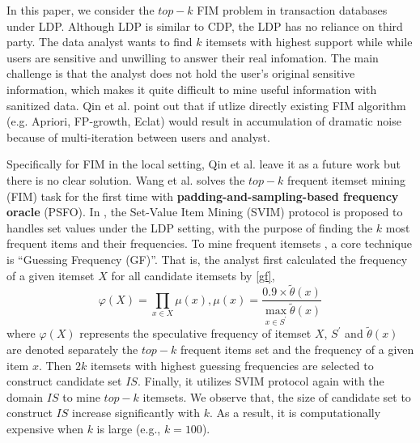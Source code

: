 \documentclass[conference]{IEEEtran}
\begin{document}
%

In this paper, we consider the $top-k$ FIM problem in transaction databases under LDP. Although LDP is similar to CDP, the LDP has no reliance on third party. The data analyst wants to find $k$ itemsets with highest support while while users are sensitive and unwilling to answer their real infomation. The main challenge is that the analyst does not hold the user's original sensitive information, which makes it quite difficult to mine useful information with sanitized data. Qin et al.\cite{a1} point out that if utlize directly existing FIM algorithm (e.g. Apriori\cite{apriori,apr}, FP-growth\cite{fp}, Eclat\cite{eclat}) would result in accumulation of dramatic noise because of multi-iteration between users and analyst.

Specifically for FIM in the local setting, Qin et al.\cite{a1} leave it as a future work but there is no clear solution. Wang et al.\cite{a2} solves  the $top-k$ frequent itemset mining (FIM) task for the first time with \textbf{padding-and-sampling-based frequency oracle} (PSFO). In \cite{a2}, the Set-Value Item Mining (SVIM) protocol is proposed to handles set values under the LDP setting, with the purpose of finding the $k$ most frequent items and their frequencies. To mine frequent itemsets , a core technique is {\color{red}``Guessing Frequency (GF)''}. That is, the analyst first calculated  the frequency of a given itemset $X$ for all candidate itemsets by \eqref{gf},
\begin{equation}
\varphi(X)=\prod_{x \in X} \mu(x) , \mu(x) = \frac{0.9\times \tilde{\theta}(x)}{\max \limits_{x \in S^{\prime}} \tilde{\theta}(x)}\label{gf}
\end{equation}
where $\varphi(X)$ represents the speculative frequency of itemset $X$, $S^{\prime}$ and $\tilde{\theta}(x)$ are denoted separately the $top-k$ frequent items set and the frequency of a given item $x$. Then $2k$ itemsets with highest guessing frequencies are selected to construct candidate set $IS$. Finally, it utilizes SVIM protocol again with the domain $IS$ to mine $top-k$ itemsets. We observe that, the size of candidate set to construct $IS$ increase significantly with $k$. As a result, it is computationally expensive when $k$ is large (e.g., $k=100$). 
\end{document}

